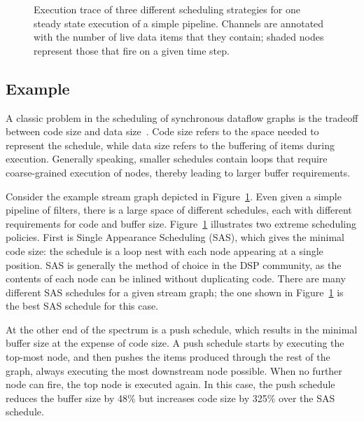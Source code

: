 \begin{figure}[t]
\caption{\small Execution trace of three different scheduling
strategies for one steady state execution of a simple pipeline.
Channels are annotated with the number of live data items that they
contain; shaded nodes represent those that fire on a given time
step.\protect\label{fig:trace}}
\end{figure}

\subsection{Example}
\label{sec:sched-vs-buffer}

A classic problem in the scheduling of synchronous dataflow graphs is
the tradeoff between code size and data size~\cite{bhat1999x1}.  Code
size refers to the space needed to represent the schedule, while data
size refers to the buffering of items during execution.  Generally
speaking, smaller schedules contain loops that require coarse-grained
execution of nodes, thereby leading to larger buffer requirements.

Consider the example stream graph depicted in Figure~\ref{fig:trace}.
Even given a simple pipeline of filters, there is a large space of
different schedules, each with different requirements for code and
buffer size.  Figure~\ref{fig:trace} illustrates two extreme
scheduling policies.  First is Single Appearance Scheduling (SAS),
which gives the minimal code size: the schedule is a loop nest with
each node appearing at a single position.  SAS is generally the method
of choice in the DSP community, as the contents of each node can be
inlined without duplicating code.  There are many different SAS
schedules for a given stream graph; the one shown in
Figure~\ref{fig:trace} is the best SAS schedule for this case.

At the other end of the spectrum is a push schedule, which results in
the minimal buffer size at the expense of code size.  A push schedule
starts by executing the top-most node, and then pushes the items
produced through the rest of the graph, always executing the most
downstream node possible.  When no further node can fire, the top node
is executed again.  In this case, the push schedule reduces the buffer
size by 48\% but increases code size by 325\% over the SAS schedule.

